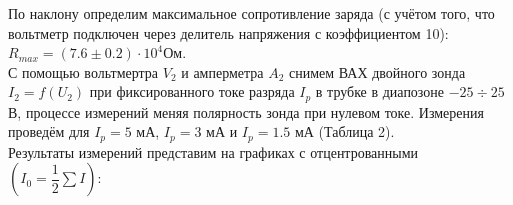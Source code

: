 \documentclass[a4paper,12pt]{article}
\begin{document}
\begin{center}
\end{center}

По наклону определим максимальное сопротивление заряда (с учётом того, что вольтметр подключен через делитель напряжения с коэффициентом 10): $R_{max} = (7.6\pm 0.2)\cdot 10^4\text{Ом}$.\\
С помощью вольтмертра $V_2$ и амперметра $A_2$ снимем ВАХ двойного зонда $I_2 = f(U_2)$ при фиксированного токе разряда $I_p$ в трубке в диапозоне $-25 \div 25$ В, процессе измерений меняя полярность зонда при нулевом токе. Измерения проведём для $I_p = 5$ мА, $I_p = 3$ мА  и $I_p = 1.5$ мА (Таблица 2).\\
Результаты измерений представим на графиках с отцентрованными $\left(I_0 = \dfrac{1}{2}\sum I\right)$:
\newpage
\end{document}
